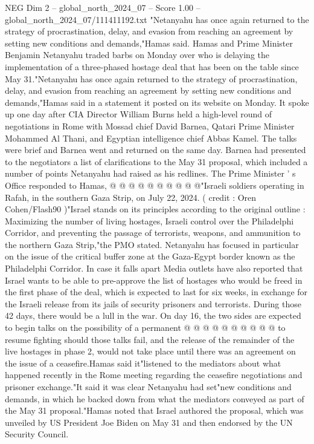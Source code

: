 \begin{textsample}{NEG Dim 2 – global\_north\_2024\_07 – Score 1.00 – global\_north\_2024\_07/111411192.txt}  \label{ex:f2_neg_261}
"Netanyahu has once again returned to the strategy of procrastination, delay, and evasion from reaching an agreement by setting new conditions and demands,"Hamas said.
Hamas and Prime Minister Benjamin Netanyahu traded barbs on Monday over who is delaying the implementation of a three-phased hostage deal that has been on the table since May 31."Netanyahu has once again returned to the strategy of procrastination, delay, and evasion from reaching an agreement by setting new conditions and demands,"Hamas said in a statement it posted on its website on Monday.
It spoke up one day after CIA Director William Burns held a high-level round of negotiations in Rome with Mossad chief David Barnea, Qatari Prime Minister Mohammed Al Thani, and Egyptian intelligence chief Abbas Kamel.
The talks were brief and Barnea went and returned on the same day.
Barnea had presented to the negotiators a list of clarifications to the May 31 proposal, which included a number of points Netanyahu had raised as his redlines.
The Prime Minister ' s Office responded to Hamas, @ @ @ @ @ @ @ @ @ @"Israeli soldiers operating in Rafah, in the southern Gaza Strip, on July 22, 2024. ( credit : Oren Cohen/Flash90 )"Israel stands on its principles according to the original outline : Maximizing the number of living hostages, Israeli control over the Philadelphi Corridor, and preventing the passage of terrorists, weapons, and ammunition to the northern Gaza Strip,"the PMO stated.
Netanyahu has focused in particular on the issue of the critical buffer zone at the Gaza-Egypt border known as the Philadelphi Corridor.
In case it falls apart Media outlets have also reported that Israel wants to be able to pre-approve the list of hostages who would be freed in the first phase of the deal, which is expected to last for six weeks, in exchange for the Israeli release from its jails of security prisoners and terrorists.
During those 42 days, there would be a lull in the war.
On day 16, the two sides are expected to begin talks on the possibility of a permanent @ @ @ @ @ @ @ @ @ @ to resume fighting should those talks fail, and the release of the remainder of the live hostages in phase 2, would not take place until there was an agreement on the issue of a ceasefire.Hamas said it"listened to the mediators about what happened recently in the Rome meeting regarding the ceasefire negotiations and prisoner exchange."It said it was clear Netanyahu had set"new conditions and demands, in which he backed down from what the mediators conveyed as part of the May 31 proposal."Hamas noted that Israel authored the proposal, which was unveiled by US President Joe Biden on May 31 and then endorsed by the UN Security Council.

\end{textsample}
